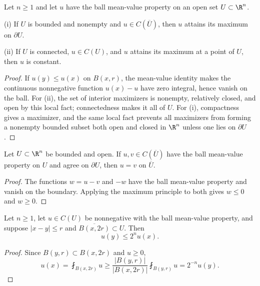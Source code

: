 \begin{theorem}
\label{thm:strong-maximum-principle-mvp}
\leanok
Let $n\ge1$ and let $u$ have the ball mean-value property on an open set
$U\subset\R^n$.

(i) If $U$ is bounded and nonempty and $u\in C(\overline U)$, then $u$ attains
its maximum on $\partial U$.

(ii) If $U$ is connected, $u\in C(U)$, and $u$ attains its maximum at a point
of $U$, then $u$ is constant.
\end{theorem}
\begin{proof}
\leanok
\sketch If $u(y)\le u(x)$ on $B(x,r)$, the mean-value identity makes the
continuous nonnegative function $u(x)-u$ have zero integral, hence vanish on
the ball. For (ii), the set of interior maximizers is nonempty, relatively
closed, and open by this local fact; connectedness makes it all of $U$. For
(i), compactness gives a maximizer, and the same local fact prevents all
maximizers from forming a nonempty bounded subset both open and closed in
$\R^n$ unless one lies on $\partial U$.
\end{proof}

\begin{theorem}
\label{thm:uniqueness-dirichlet-mvp}
\leanok
Let $U\subset\R^n$ be bounded and open. If $u,v\in C(\overline U)$ have the
ball mean-value property on $U$ and agree on $\partial U$, then
$u=v$ on $\overline U$.
\end{theorem}
\begin{proof}
\leanok
\sketch The functions $w=u-v$ and $-w$ have the ball mean-value property and
vanish on the boundary. Applying the maximum principle to both gives
$w\le0$ and $w\ge0$.
\end{proof}

\begin{theorem}
\label{thm:harnack-local-mvp}
\leanok
Let $n\ge1$, let $u\in C(U)$ be nonnegative with the ball mean-value property,
and suppose $|x-y|\le r$ and $\overline{B(x,2r)}\subset U$. Then
$$u(y)\le2^n u(x).$$
\end{theorem}
\begin{proof}
\leanok
\sketch Since $B(y,r)\subset B(x,2r)$ and $u\ge0$,
$$u(x)=\fint_{B(x,2r)}u
\ge\frac{|B(y,r)|}{|B(x,2r)|}\fint_{B(y,r)}u
=2^{-n}u(y).$$
\end{proof}

